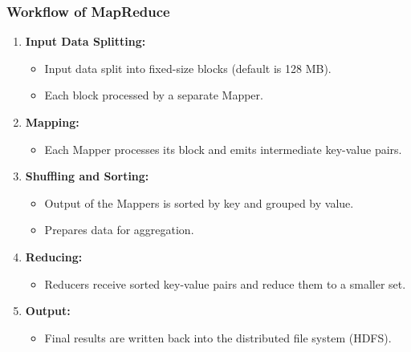 \documentclass[aspectratio=169]{beamer}
\begin{document}
\begin{frame}[fragile]
    \frametitle{Workflow of MapReduce}
    \begin{enumerate}
        \item \textbf{Input Data Splitting:} 
            \begin{itemize} 
                \item Input data split into fixed-size blocks (default is 128 MB).
                \item Each block processed by a separate Mapper.
            \end{itemize} 
        \item \textbf{Mapping:} 
            \begin{itemize} 
                \item Each Mapper processes its block and emits intermediate key-value pairs.
            \end{itemize} 
        \item \textbf{Shuffling and Sorting:} 
            \begin{itemize} 
                \item Output of the Mappers is sorted by key and grouped by value.
                \item Prepares data for aggregation.
            \end{itemize} 
        \item \textbf{Reducing:} 
            \begin{itemize} 
                \item Reducers receive sorted key-value pairs and reduce them to a smaller set.
            \end{itemize} 
        \item \textbf{Output:} 
            \begin{itemize}
                \item Final results are written back into the distributed file system (HDFS).
            \end{itemize}
    \end{enumerate}
\end{frame}
\end{document}
